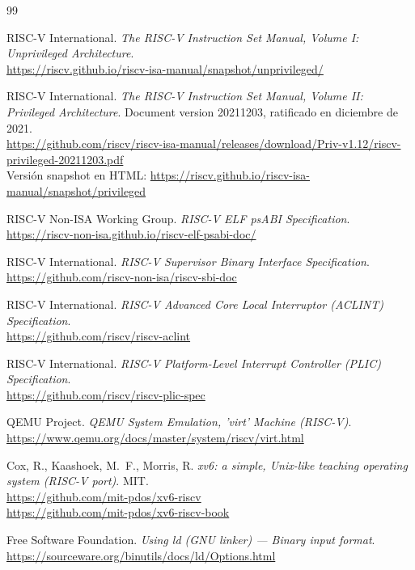 \documentclass[a4paper]{article}
\begin{document}
\begin{thebibliography}{99}

RISC-V International. \emph{The RISC-V Instruction Set Manual, Volume I: Unprivileged Architecture}. \\
\url{https://riscv.github.io/riscv-isa-manual/snapshot/unprivileged/}

RISC-V International. \emph{The RISC-V Instruction Set Manual, Volume II: Privileged Architecture}. Document version
20211203, ratificado en diciembre de 2021. \\
\url{https://github.com/riscv/riscv-isa-manual/releases/download/Priv-v1.12/riscv-privileged-20211203.pdf} \\
Versión snapshot en HTML: \url{https://riscv.github.io/riscv-isa-manual/snapshot/privileged}

RISC-V Non-ISA Working Group. \emph{RISC-V ELF psABI Specification}. \\
\url{https://riscv-non-isa.github.io/riscv-elf-psabi-doc/}

RISC-V International. \emph{RISC-V Supervisor Binary Interface Specification}. \\
\url{https://github.com/riscv-non-isa/riscv-sbi-doc}

RISC-V International. \emph{RISC-V Advanced Core Local Interruptor (ACLINT) Specification}. \\
\url{https://github.com/riscv/riscv-aclint}

RISC-V International. \emph{RISC-V Platform-Level Interrupt Controller (PLIC) Specification}. \\
\url{https://github.com/riscv/riscv-plic-spec}

QEMU Project. \emph{QEMU System Emulation, 'virt' Machine (RISC-V)}. \\
\url{https://www.qemu.org/docs/master/system/riscv/virt.html}

Cox, R., Kaashoek, M.~F., Morris, R. \emph{xv6: a simple, Unix-like teaching operating system (RISC-V port)}. MIT. \\
\url{https://github.com/mit-pdos/xv6-riscv} \\
\url{https://github.com/mit-pdos/xv6-riscv-book}

Free Software Foundation. \emph{Using ld (GNU linker) --- Binary input format}. \\
\url{https://sourceware.org/binutils/docs/ld/Options.html}


\end{thebibliography}
\end{document}
